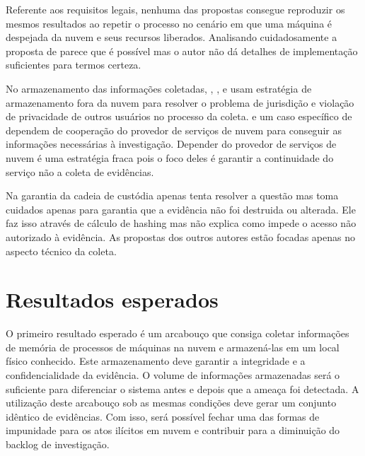 \documentclass[12pt,				%
	openright,			%
	oneside,			%
	a4paper,			%
	english,			%
	brazil				%
	]{abntex2}
\begin{document}
Referente aos requisitos legais, nenhuma das propostas consegue reproduzir os mesmos resultados ao repetir o processo no cenário em que uma máquina é despejada da nuvem e seus 
recursos liberados. Analisando cuidadosamente a proposta de \cite{George2012} parece que é possível mas o autor não dá detalhes de implementação suficientes para termos certeza.

No armazenamento das informações coletadas, \cite{Reichert2015}, \cite{George2012}, \cite{Poisel2013} e \cite{Dykstra2013} usam estratégia de armazenamento fora da nuvem para 
resolver o problema de jurisdição e violação de privacidade de outros usuários no processo da coleta. \cite{Sang2013} e um caso específico de \cite{George2012} dependem de 
cooperação do provedor de serviços de nuvem para conseguir as informações necessárias à investigação. Depender do provedor de serviços de nuvem é uma estratégia fraca pois o foco
deles é garantir a continuidade do serviço não a coleta de evidências. 

Na garantia da cadeia de custódia apenas \cite{Sang2013} tenta resolver a questão mas toma cuidados apenas para  garantia que a evidência não foi destruida ou alterada. 
Ele faz isso através de cálculo de hashing mas não explica como impede o acesso não autorizado à evidência. As propostas dos outros autores estão focadas apenas no 
aspecto técnico da coleta.

\chapter{Resultados esperados} \label{chap:result}
O primeiro resultado esperado é um arcabouço que consiga coletar informações de memória de processos de máquinas na nuvem e armazená-las em um local físico conhecido.
Este armazenamento deve garantir a integridade e a confidencialidade da evidência. O volume de informações armazenadas será o suficiente para diferenciar o sistema antes 
e depois que a ameaça foi detectada. A utilização deste arcabouço sob as mesmas condições deve gerar um conjunto idêntico de evidências. Com isso, será possível fechar 
uma das formas de impunidade para os atos ilícitos em nuvem e contribuir para a diminuição do backlog de investigação.



\postextual

%  

\begin{comment}
\printindex
\end{comment}

\end{document}

